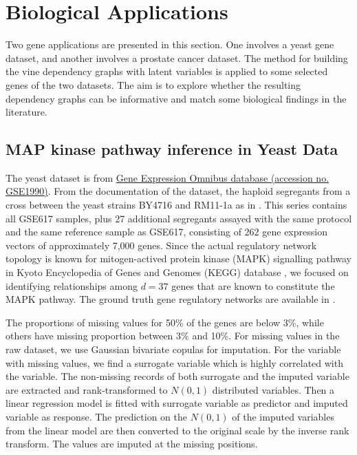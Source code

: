 \documentclass[a4paper]{article}
\begin{document}
\section{Biological Applications}
\label{sec-data-application}

Two gene applications are presented in this section. 
One involves a yeast gene dataset, and another involves a prostate cancer dataset. The method for building the vine dependency graphs with latent variables is applied to some selected genes of the two datasets. The aim is to explore whether the resulting dependency graphs can be informative and match some biological findings in the literature.


\subsection{MAP kinase pathway inference in Yeast Data}
\label{sec-yeast}

The yeast dataset is from  \href{https://www.ncbi.nlm.nih.gov/geo/query/acc.cgi?acc=gse1990}{Gene Expression Omnibus database (accession no. GSE1990)}. 
From the documentation of the dataset, the haploid segregants from a cross between the yeast strains BY4716 and RM11-1a as in \cite{brem2002genetic}. 
This series contains all GSE617 samples, plus 27 additional segregants assayed with the same protocol and the same reference sample as GSE617, consisting of 
$262$ gene expression vectors of approximately 7,000 genes.
Since the actual regulatory network topology is known for mitogen-actived protein kinase (MAPK) signalling pathway in Kyoto Encyclopedia of Genes and Genomes (KEGG) database \cite{kanehisa2010kegg}, we focused on identifying relationships among $d=37$ genes that are known to constitute the MAPK pathway.
The ground truth gene regulatory networks are available in \cite{kelder2012wikipathways}. 

The proportions of missing values for 50\% of the genes are below 3\%, while others have missing proportion between 3\% and 10\%. For missing values in the raw dataset, we use Gaussian bivariate copulas for imputation.  For the variable with missing values, we find a surrogate variable which is highly correlated with the variable.  The non-missing records of both surrogate and the imputed variable are extracted and rank-transformed to $N(0,1)$ distributed variables.  Then a linear regression model is fitted with surrogate variable as predictor and imputed variable as response.  The prediction on the $N(0,1)$ of the imputed variables from the linear model are then converted to the original scale by the inverse rank transform.  The values are imputed at the missing positions.
\end{document}
